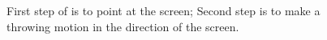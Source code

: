 \begin{figure}
\hspace{0.02\columnwidth} 
\caption{
	\protect{} First step of \throw is to point at the screen; 
	\protect{} Second step is to make a throwing motion in the direction of the screen.
}
\label{fig:throwTechnique}
\end{figure}

